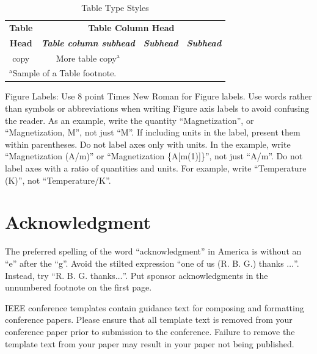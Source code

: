 \documentclass[conference]{IEEEtran}
\begin{document}
\begin{table}[htbp]
\caption{Table Type Styles}
\begin{center}
\begin{tabular}{|c|c|c|c|}
\hline
\textbf{Table}&\multicolumn{3}{|c|}{\textbf{Table Column Head}} \\
\cline{2-4}
\textbf{Head} & \textbf{\textit{Table column subhead}}& \textbf{\textit{Subhead}}& \textbf{\textit{Subhead}} \\
\hline
copy& More table copy$^{\mathrm{a}}$& &  \\
\hline
\multicolumn{4}{l}{$^{\mathrm{a}}$Sample of a Table footnote.}
\end{tabular}
\label{tab1}
\end{center}
\end{table}


Figure Labels: Use 8 point Times New Roman for Figure labels. Use words
rather than symbols or abbreviations when writing Figure axis labels to
avoid confusing the reader. As an example, write the quantity
``Magnetization'', or ``Magnetization, M'', not just ``M''. If including
units in the label, present them within parentheses. Do not label axes only
with units. In the example, write ``Magnetization (A/m)'' or ``Magnetization
\{A[m(1)]\}'', not just ``A/m''. Do not label axes with a ratio of
quantities and units. For example, write ``Temperature (K)'', not
``Temperature/K''.

\section*{Acknowledgment}

The preferred spelling of the word ``acknowledgment'' in America is without
an ``e'' after the ``g''. Avoid the stilted expression ``one of us (R. B.
G.) thanks $\ldots$''. Instead, try ``R. B. G. thanks$\ldots$''. Put sponsor
acknowledgments in the unnumbered footnote on the first page.





\vspace{12pt}
\color{red}
IEEE conference templates contain guidance text for composing and formatting conference papers. Please ensure that all template text is removed from your conference paper prior to submission to the conference. Failure to remove the template text from your paper may result in your paper not being published.
\end{document}
